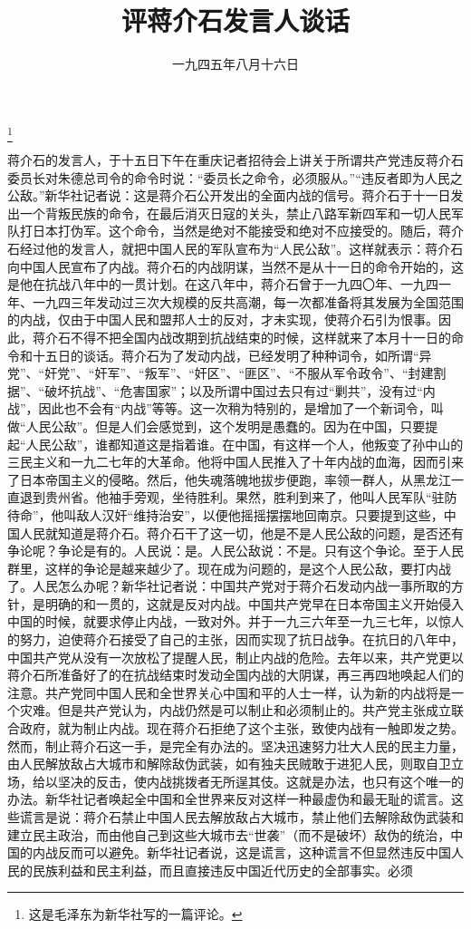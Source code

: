 
\title{评蒋介石发言人谈话}
\date{一九四五年八月十六日}
\thanks{这是毛泽东为新华社写的一篇评论。}
\maketitle


蒋介石的发言人，于十五日下午在重庆记者招待会上讲关于所谓共产党违反蒋介石委员长对朱德总司令的命令时说：“委员长之命令，必须服从。”“违反者即为人民之公敌。”新华社记者说：这是蒋介石公开发出的全面内战的信号。蒋介石于十一日发出一个背叛民族的命令，在最后消灭日寇的关头，禁止八路军新四军和一切人民军队打日本打伪军。这个命令，当然是绝对不能接受和绝对不应接受的。随后，蒋介石经过他的发言人，就把中国人民的军队宣布为“人民公敌”。这样就表示：蒋介石向中国人民宣布了内战。蒋介石的内战阴谋，当然不是从十一日的命令开始的，这是他在抗战八年中的一贯计划。在这八年中，蒋介石曾于一九四〇年、一九四一年、一九四三年发动过三次大规模的反共高潮，每一次都准备将其发展为全国范围的内战，仅由于中国人民和盟邦人士的反对，才未实现，使蒋介石引为恨事。因此，蒋介石不得不把全国内战改期到抗战结束的时候，这样就来了本月十一日的命令和十五日的谈话。蒋介石为了发动内战，已经发明了种种词令，如所谓“异党”、“奸党”、“奸军”、“叛军”、“奸区”、“匪区”、“不服从军令政令”、“封建割据”、“破坏抗战”、“危害国家”；以及所谓中国过去只有过“剿共”，没有过“内战”，因此也不会有“内战”等等。这一次稍为特别的，是增加了一个新词令，叫做“人民公敌”。但是人们会感觉到，这个发明是愚蠢的。因为在中国，只要提起“人民公敌”，谁都知道这是指着谁。在中国，有这样一个人，他叛变了孙中山的三民主义和一九二七年的大革命。他将中国人民推入了十年内战的血海，因而引来了日本帝国主义的侵略。然后，他失魂落魄地拔步便跑，率领一群人，从黑龙江一直退到贵州省。他袖手旁观，坐待胜利。果然，胜利到来了，他叫人民军队“驻防待命”，他叫敌人汉奸“维持治安”，以便他摇摇摆摆地回南京。只要提到这些，中国人民就知道是蒋介石。蒋介石干了这一切，他是不是人民公敌的问题，是否还有争论呢？争论是有的。人民说：是。人民公敌说：不是。只有这个争论。至于人民群里，这样的争论是越来越少了。现在成为问题的，是这个人民公敌，要打内战了。人民怎么办呢？新华社记者说：中国共产党对于蒋介石发动内战一事所取的方针，是明确的和一贯的，这就是反对内战。中国共产党早在日本帝国主义开始侵入中国的时候，就要求停止内战，一致对外。并于一九三六年至一九三七年，以惊人的努力，迫使蒋介石接受了自己的主张，因而实现了抗日战争。在抗日的八年中，中国共产党从没有一次放松了提醒人民，制止内战的危险。去年以来，共产党更以蒋介石所准备好了的在抗战结束时发动全国内战的大阴谋，再三再四地唤起人们的注意。共产党同中国人民和全世界关心中国和平的人士一样，认为新的内战将是一个灾难。但是共产党认为，内战仍然是可以制止和必须制止的。共产党主张成立联合政府，就为制止内战。现在蒋介石拒绝了这个主张，致使内战有一触即发之势。然而，制止蒋介石这一手，是完全有办法的。坚决迅速努力壮大人民的民主力量，由人民解放敌占大城市和解除敌伪武装，如有独夫民贼敢于进犯人民，则取自卫立场，给以坚决的反击，使内战挑拨者无所逞其伎。这就是办法，也只有这个唯一的办法。新华社记者唤起全中国和全世界来反对这样一种最虚伪和最无耻的谎言。这些谎言是说：蒋介石禁止中国人民去解放敌占大城市，禁止他们去解除敌伪武装和建立民主政治，而由他自己到这些大城市去“世袭”（而不是破坏）敌伪的统治，中国的内战反而可以避免。新华社记者说，这是谎言，这种谎言不但显然违反中国人民的民族利益和民主利益，而且直接违反中国近代历史的全部事实。必须